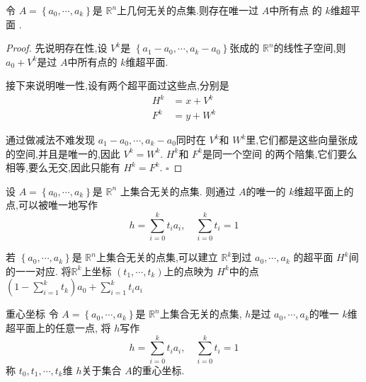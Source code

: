 \documentclass[../../几何与拓扑.tex]{subfiles}
\begin{document}
\begin{proposition}
    令 \(  A =  \left\{  a_0,\cdots,a_{k}    \right\}  \)是 \(  \mathbb{R} ^{n}  \)上几何无关的点集.则存在唯一过 \(  A  \)中所有点 的 \(  k  \)维超平面   .
\end{proposition}
\begin{proof}

    先说明存在性,设 \(  V^{k}  \)是 \(  \left\{ a_1-a_0,\cdots ,a_{k}-a_0 \right\}  \)张成的 \(  \mathbb{R} ^{n}  \)的线性子空间,则 \(  a_0+ V^{k}  \)是过 \(  A  \)中所有点的 \(  k  \)维超平面.      

    接下来说明唯一性,设有两个超平面过这些点,分别是 \[
    \begin{aligned}
    H^{k}& =  x + V^{k}\\ 
     F^{k}& =  y+ W^{k} 
    \end{aligned}
    \]

    通过做减法不难发现 \(  a_1-a_0,\cdots ,a_{k}-a_0  \)同时在   \(  V^{k}  \)和 \(  W^{k}  \)里,它们都是这些向量张成的空间,并且是唯一的,因此 \(  V^{k}= W^{k}  \).
    \(  H^{k}  \)和 \(  F^{k}  \)是同一个空间 的两个陪集,它们要么相等,要么无交,因此只能有 \(  H^{k} = F^{k}  \).       
    \hfill $\square$
\end{proof}


\begin{proposition}
    设 \(  A =  \left\{  a_0,\cdots,a_{k}    \right\}  \)是 \(  \mathbb{R} ^{n}  \)  上集合无关的点集.
    则通过 \(  A  \)的唯一的 \(  k  \)维超平面上的点,可以被唯一地写作 \[
    h =  \sum _{i= 0}^{k} t_{i}a_{i},\quad  \sum _{i= 0}^{k} t_{i} = 1
    \]  
\end{proposition}
\begin{remark}
    若 \(  \left\{  a_0,\cdots,a_{k}    \right\}  \)是 \(  \mathbb{R} ^{n}  \)上集合无关的点集,可以建立 \(  \mathbb{R} ^{k}  \)到过 \(  a_0,\cdots ,a_{k}  \)    的超平面 \(  H^{k}  \)间的一一对应.
    将\(  \mathbb{R} ^{k}  \)上坐标 \(  \left(  t_1,\cdots,t_k  \right)   \)上的点映为 \(  H^{k}  \)中的点 \(  \left( 1-\sum _{i= 1}^{k}t_{k} \right)   a_0+  \sum _{i= 1}^{k}t_{i}a_{i}\)     
\end{remark}


\begin{definition}{重心坐标}
    令 \(  A =  \left\{  a_0,\cdots,a_{k}    \right\}  \)是 \(  \mathbb{R} ^{n}  \)上集合无关的点集, \(  h  \)是过 \(   a_0,\cdots,a_{k}     \)的唯一 \(  k  \)维 超平面上的任意一点,
    将 \(  h  \)写作 \[
    h =  \sum _{i= 0}^{k} t_{i}a_{i},\quad \sum _{i= 0}^{k}t_{i}= 1
    \]   称 \(  t_0,t_1,\cdots ,t_{k}  \)维 \(  h  \)关于集合 \(  A  \)的重心坐标.     
\end{definition}
\end{document}
